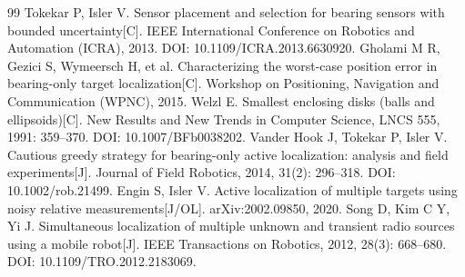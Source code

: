 \documentclass[UTF8,a4paper,zihao=-4,fontset=none]{ctexart}
\begin{document}
\begin{thebibliography}{99}
   Tokekar P, Isler V. Sensor placement and selection for bearing sensors with bounded uncertainty[C]. IEEE International Conference on Robotics and Automation (ICRA), 2013. DOI: 10.1109/ICRA.2013.6630920.
   Gholami M R, Gezici S, Wymeersch H, et al. Characterizing the worst-case position error in bearing-only target localization[C]. Workshop on Positioning, Navigation and Communication (WPNC), 2015.
   Welzl E. Smallest enclosing disks (balls and ellipsoids)[C]. New Results and New Trends in Computer Science, LNCS 555, 1991: 359--370. DOI: 10.1007/BFb0038202.
   Vander Hook J, Tokekar P, Isler V. Cautious greedy strategy for bearing-only active localization: analysis and field experiments[J]. Journal of Field Robotics, 2014, 31(2): 296--318. DOI: 10.1002/rob.21499.
   Engin S, Isler V. Active localization of multiple targets using noisy relative measurements[J/OL]. arXiv:2002.09850, 2020.
   Song D, Kim C Y, Yi J. Simultaneous localization of multiple unknown and transient radio sources using a mobile robot[J]. IEEE Transactions on Robotics, 2012, 28(3): 668--680. DOI: 10.1109/TRO.2012.2183069.
\end{thebibliography}
\end{document}
